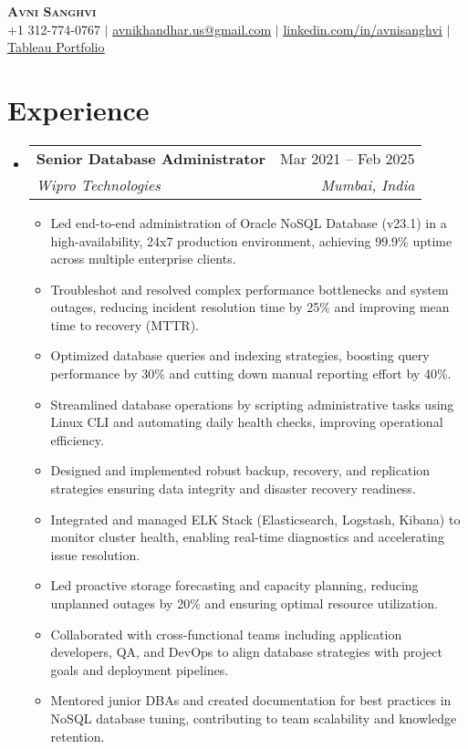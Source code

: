 \documentclass[letterpaper,11pt]{article}
\makeatletter
\newcommand{\resumeItem}[1]{\item\small{#1\vspace{-2pt}}}
\newcommand{\resumeSubheading}[4]{
  \vspace{-2pt}\item
  \begin{tabular*}{0.97\textwidth}[t]{l@{\extracolsep{\fill}}r}
    \textbf{#1} & #2 \\
    \textit{\small#3} & \textit{\small #4} \\
  \end{tabular*}\vspace{-7pt}
}
\newcommand{\resumeSubHeadingListStart}{\begin{itemize}[leftmargin=0.15in, label={}]}
\newcommand{\resumeSubHeadingListEnd}{\end{itemize}}
\newcommand{\resumeItemListStart}{\begin{itemize}[leftmargin=0.15in]}
\newcommand{\resumeItemListEnd}{\end{itemize}\vspace{-5pt}}
\makeatother
\begin{document}
\begin{center}
    \textbf{\Huge \scshape Avni Sanghvi} \\ \vspace{1pt}
    \small +1 312-774-0767 $|$ \href{mailto:avnikhandhar.us@gmail.com}{\underline{avnikhandhar.us@gmail.com}} $|$
    \href{https://www.linkedin.com/in/avnisanghvi}{\underline{linkedin.com/in/avnisanghvi}} $|$
    \href{https://public.tableau.com/app/profile/avni.sanghvi/vizzes}{\underline{Tableau Portfolio}}
\end{center}

\section{Experience}
\resumeSubHeadingListStart
  \resumeSubheading
    {Senior Database Administrator}{Mar 2021 – Feb 2025}
    {Wipro Technologies}{Mumbai, India}
    \resumeItemListStart
      \resumeItem{Led end-to-end administration of Oracle NoSQL Database (v23.1) in a high-availability, 24x7 production environment, achieving 99.9\% uptime across multiple enterprise clients.}
      \resumeItem{Troubleshot and resolved complex performance bottlenecks and system outages, reducing incident resolution time by 25\% and improving mean time to recovery (MTTR).}
      \resumeItem{Optimized database queries and indexing strategies, boosting query performance by 30\% and cutting down manual reporting effort by 40\%.}
      \resumeItem{Streamlined database operations by scripting administrative tasks using Linux CLI and automating daily health checks, improving operational efficiency.}
      \resumeItem{Designed and implemented robust backup, recovery, and replication strategies ensuring data integrity and disaster recovery readiness.}
      \resumeItem{Integrated and managed ELK Stack (Elasticsearch, Logstash, Kibana) to monitor cluster health, enabling real-time diagnostics and accelerating issue resolution.}
      \resumeItem{Led proactive storage forecasting and capacity planning, reducing unplanned outages by 20\% and ensuring optimal resource utilization.}
      \resumeItem{Collaborated with cross-functional teams including application developers, QA, and DevOps to align database strategies with project goals and deployment pipelines.}
      \resumeItem{Mentored junior DBAs and created documentation for best practices in NoSQL database tuning, contributing to team scalability and knowledge retention.}
    \resumeItemListEnd
\resumeSubHeadingListEnd
\end{document}
